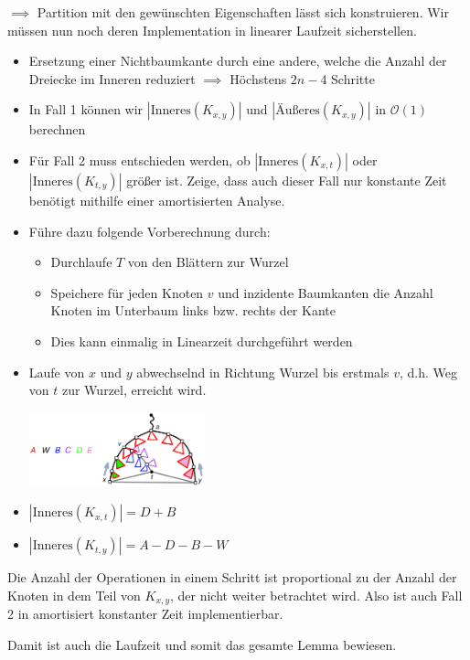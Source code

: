 $\implies$ Partition mit den gewünschten Eigenschaften lässt sich konstruieren. Wir müssen nun noch deren Implementation in linearer Laufzeit sicherstellen.

\begin{itemize}
	\item Ersetzung einer Nichtbaumkante durch eine andere, welche die Anzahl der Dreiecke im Inneren reduziert $\implies$ Höchstens $2n-4$ Schritte
	\item In Fall 1 können wir $|\text{Inneres}(K_{x,y})|$ und $|\text{Äußeres}(K_{x,y})|$ in $\mathcal{O}(1)$ berechnen
	\item Für Fall 2 muss entschieden werden, ob $|\text{Inneres}(K_{x,t})|$ oder $|\text{Inneres}(K_{t,y})|$ größer ist. Zeige, dass auch dieser Fall nur konstante Zeit benötigt mithilfe einer amortisierten Analyse.
	\item Führe dazu folgende Vorberechnung durch:
	\begin{itemize}
		\item Durchlaufe $T$ von den Blättern zur Wurzel
		\item Speichere für jeden Knoten $v$ und inzidente Baumkanten die Anzahl Knoten im Unterbaum links bzw. rechts der Kante
		\item Dies kann einmalig in Linearzeit durchgeführt werden
	\end{itemize}
	\item Laufe von $x$ und $y$ abwechselnd in Richtung Wurzel bis erstmals $v$, d.h. Weg von $t$ zur Wurzel, erreicht wird.
	\begin{center}
		\includegraphics[width=0.4\textwidth]{images/pst-6.png}
	\end{center}
	\item $|\text{Inneres}(K_{x,t})|=D+B$
	\item $|\text{Inneres}(K_{t,y})|=A-D-B-W$
\end{itemize}
\bigskip
Die Anzahl der Operationen in einem Schritt ist proportional zu der Anzahl der Knoten in dem Teil von $K_{x,y}$, der nicht weiter betrachtet wird. Also ist auch Fall 2 in amortisiert konstanter Zeit implementierbar.

Damit ist auch die Laufzeit und somit das gesamte Lemma bewiesen.
